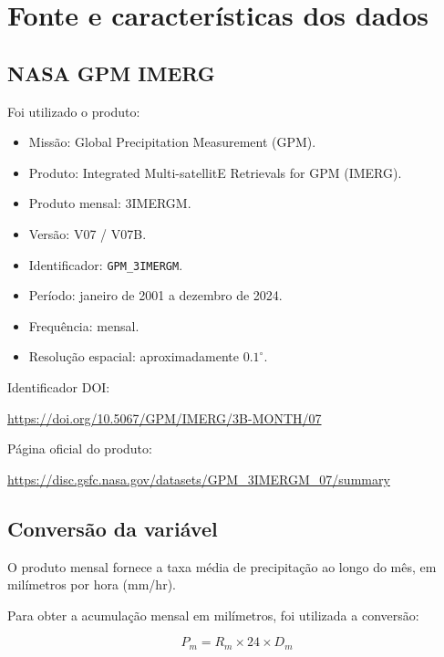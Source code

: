 \documentclass[12pt,a4paper]{article}
\begin{document}
\section{Fonte e características dos dados}

\subsection{NASA GPM IMERG}

Foi utilizado o produto:

\begin{itemize}
    \item Missão: Global Precipitation Measurement (GPM).
    \item Produto: Integrated Multi-satellitE Retrievals
    for GPM (IMERG).
    \item Produto mensal: 3IMERGM.
    \item Versão: V07 / V07B.
    \item Identificador: \texttt{GPM\_3IMERGM}.
    \item Período: janeiro de 2001 a dezembro de 2024.
    \item Frequência: mensal.
    \item Resolução espacial: aproximadamente $0.1^\circ$.
\end{itemize}

Identificador DOI:

\begin{center}
\url{https://doi.org/10.5067/GPM/IMERG/3B-MONTH/07}
\end{center}

Página oficial do produto:

\begin{center}
\url{https://disc.gsfc.nasa.gov/datasets/GPM_3IMERGM_07/summary}
\end{center}

\subsection{Conversão da variável}

O produto mensal fornece a taxa média de precipitação
ao longo do mês, em milímetros por hora (mm/hr).

Para obter a acumulação mensal em milímetros, foi
utilizada a conversão:

\begin{equation}
P_m = R_m \times 24 \times D_m
\end{equation}
\end{document}
